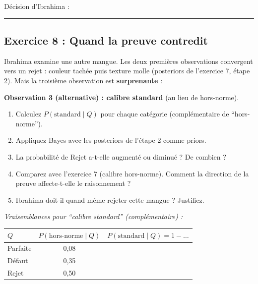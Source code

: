 \documentclass[11pt,a4paper]{article}
\begin{document}
\noindent Décision d'Ibrahima : \rule{8cm}{0.4pt}

\newpage

\subsection*{Exercice 8 : Quand la preuve contredit}

\begin{exercicebox}[Énoncé]
Ibrahima examine une autre mangue. Les deux premières observations convergent vers un rejet : couleur tachée puis texture molle (posteriors de l'exercice 7, étape 2). Mais la troisième observation est \textbf{surprenante} :

\textbf{Observation 3 (alternative) : calibre standard} (au lieu de hors-norme).

\begin{enumerate}
    \item Calculez $P(\text{standard} \mid Q)$ pour chaque catégorie (complémentaire de ``hors-norme'').
    \item Appliquez Bayes avec les posteriors de l'étape 2 comme priors.
    \item La probabilité de Rejet a-t-elle augmenté ou diminué ? De combien ?
    \item Comparez avec l'exercice 7 (calibre hors-norme). Comment la direction de la preuve affecte-t-elle le raisonnement ?
    \item Ibrahima doit-il quand même rejeter cette mangue ? Justifiez.
\end{enumerate}
\end{exercicebox}

\noindent\textit{Vraisemblances pour ``calibre standard'' (complémentaire) :}

\begin{center}
\renewcommand{\arraystretch}{1.8}
\begin{tabular}{|l|c|c|}
\hline
$Q$ & $P(\text{hors-norme} \mid Q)$ & $P(\text{standard} \mid Q) = 1 - \ldots$ \\
\hline
Parfaite & 0,08 & \hspace{3cm} \\
\hline
Défaut & 0,35 & \\
\hline
Rejet & 0,50 & \\
\hline
\end{tabular}
\end{center}
\end{document}
